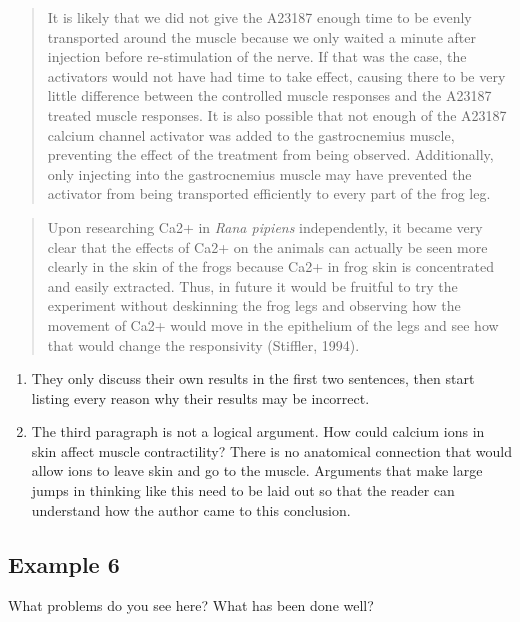 \documentclass[
]{book}
\providecommand{\tightlist}{%
  \setlength{\itemsep}{0pt}\setlength{\parskip}{0pt}}
\begin{document}
\begin{quote}
It is likely that we did not give the A23187 enough time to be evenly transported around the muscle because we only waited a minute after injection before re-stimulation of the nerve. If that was the case, the activators would not have had time to take effect, causing there to be very little difference between the controlled muscle responses and the A23187 treated muscle responses. It is also possible that not enough of the A23187 calcium channel activator was added to the gastrocnemius muscle, preventing the effect of the treatment from being observed. Additionally, only injecting into the gastrocnemius muscle may have prevented the activator from being transported efficiently to every part of the frog leg.
\end{quote}

\begin{quote}
Upon researching Ca2+ in \emph{Rana pipiens} independently, it became very clear that the effects of Ca2+ on the animals can actually be seen more clearly in the skin of the frogs because Ca2+ in frog skin is concentrated and easily extracted. Thus, in future it would be fruitful to try the experiment without deskinning the frog legs and observing how the movement of Ca2+ would move in the epithelium of the legs and see how that would change the responsivity (Stiffler, 1994).
\end{quote}

\begin{enumerate}
\def\labelenumi{\arabic{enumi}.}
\tightlist
\item
  They only discuss their own results in the first two sentences, then start listing every reason why their results may be incorrect.
\item
  The third paragraph is not a logical argument. How could calcium ions in skin affect muscle contractility? There is no anatomical connection that would allow ions to leave skin and go to the muscle. Arguments that make large jumps in thinking like this need to be laid out so that the reader can understand how the author came to this conclusion.
\end{enumerate}

\hypertarget{example-6-1}{%
\subsection{Example 6}\label{example-6-1}}

What problems do you see here? What has been done well?
\end{document}
